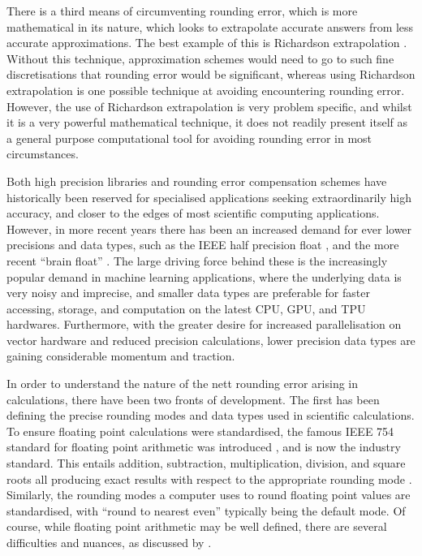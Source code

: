 \documentclass[9pt,a4paper,english]{extarticle}
\begin{document}
There is a third means of circumventing rounding error, which is more mathematical in its nature, which looks to extrapolate accurate answers from less accurate approximations. The best example of this is Richardson extrapolation \citep{richardson1927viii,marchuk2012difference}. Without this technique, approximation schemes would need to go to such fine discretisations that rounding error would be significant, whereas using Richardson extrapolation is one possible technique at avoiding encountering rounding error. However, the use of Richardson extrapolation is very problem specific, and whilst it is a very powerful mathematical technique, it does not readily present itself as a general purpose computational tool for avoiding rounding error in most circumstances.  

Both high precision libraries and rounding error compensation schemes have historically been reserved for specialised applications seeking extraordinarily high accuracy, and closer to the edges of most scientific computing applications. However, in more recent years there has been an increased demand for ever lower precisions and data types, such as the IEEE half precision float \citep{ieee2008ieee}, and the more recent ``brain float'' \citep{burgess2019bfloat16,kalamkar2019study}. The large driving force behind these is the increasingly popular demand in machine learning applications, where the underlying data is very noisy and imprecise, and smaller data types are preferable for faster accessing, storage, and computation on the latest CPU, GPU, and TPU hardwares. Furthermore, with the greater desire for increased parallelisation on vector hardware and reduced precision calculations, lower precision data types are gaining considerable momentum and traction. 

In order to understand the nature of the nett rounding error arising in calculations, there have been two fronts of development. The first has been defining the precise rounding modes and data types used in scientific calculations. To ensure floating point calculations were standardised, the famous IEEE 754 standard for floating point arithmetic was introduced \citep{ieee1985ieee}, and is now the industry standard. This entails addition, subtraction, multiplication, division, and square roots all producing exact results with respect to the appropriate rounding mode \citep[page~15]{tucker2011validated}. Similarly, the rounding modes a computer uses to round floating point values are standardised, with ``round to nearest even'' typically being the default mode. Of course, while floating point arithmetic may be well defined, there are several difficulties and nuances, as discussed by \citet{goldberg1991every}.
\end{document}
